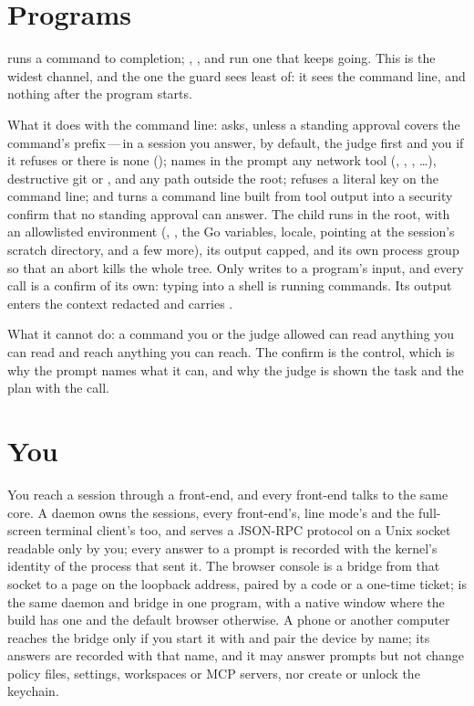 \section{Programs}

 runs a command to completion; ,
,  and  run one that
keeps going. This is the widest channel, and the one the guard sees least
of: it sees the command line, and nothing after the program starts.

What it does with the command line: asks, unless a standing approval covers
the command's prefix\,---\,in a session you answer, by default, the judge
first and you if it refuses or there is none ();
names in the prompt any network tool
(, , , \ldots), destructive git or
, and any path outside the root; refuses a literal key on the
command line; and turns a command line built from tool output into a
security confirm that no standing approval can answer. The child runs in the
root, with an allowlisted environment (, , the Go
variables, locale,  pointing at the session's scratch
directory, and a few more), its output capped, and its own process group so
that an abort kills the whole tree. Only  writes to a
program's input, and every call is a confirm of its own: typing into a
shell is running commands. Its output enters the context redacted and carries
.

What it cannot do: a command you or the judge allowed can read anything
you can read and reach anything you can reach. The confirm is the control,
which is why the prompt names what it can, and why the judge is shown the
task and the plan with the call.

\section{You}

You reach a session through a front-end, and every front-end talks to the
same core. A daemon owns the sessions, every front-end's, line mode's and
the full-screen terminal client's too, and serves a JSON-RPC protocol on a Unix socket readable only by you; every
answer to a prompt is recorded with the kernel's identity of the process that
sent it. The browser console is a bridge from that socket to a page on the
loopback address, paired by a code or a one-time ticket; 
is the same daemon and bridge in one program, with a native window where
the build has one and the default browser otherwise. A phone
or another computer reaches the bridge only if you start it with
 and pair the device by name; its answers are recorded with
that name, and it may answer prompts but not change policy files,
settings, workspaces or MCP servers, nor create or unlock the keychain.

